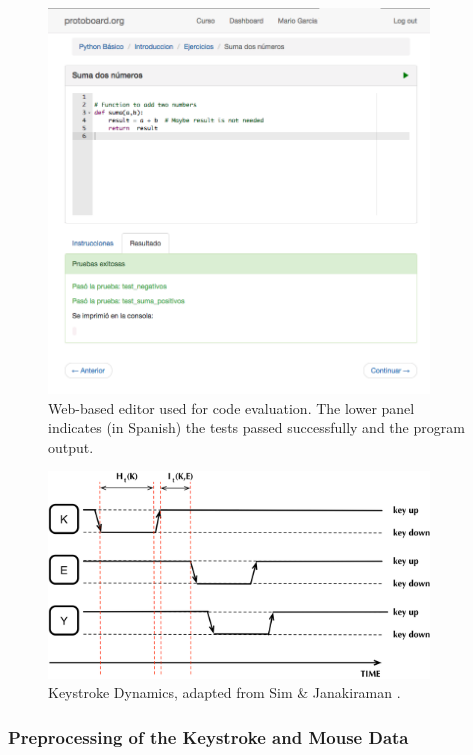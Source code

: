 \documentclass[a4paper,twoside]{article}
\begin{document}
\begin{figure}[h!t] 
\centering 
\includegraphics[width=0.9\textwidth]{editorRresult.png} 
\caption{Web-based editor used for code evaluation. The lower panel
  indicates (in Spanish) the tests passed successfully and the program
  output.}
\label{fig_editor} 
\end{figure}

\begin{figure}[hb!] 
\centering 
\includegraphics[width=0.9\textwidth]{KeyDyn.png} 
\caption{Keystroke Dynamics, adapted from Sim \& Janakiraman \cite{sim2007digraphs}.}
\label{fig_KD} 
\end{figure}

\subsubsection{Preprocessing of the Keystroke and Mouse Data} 
\end{document}
